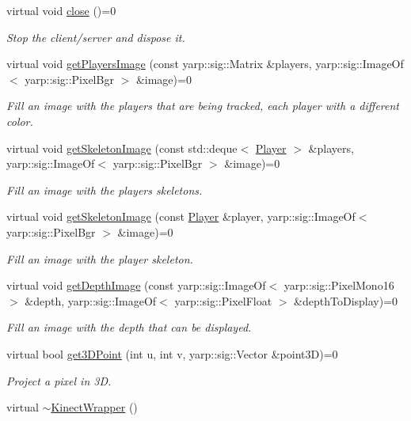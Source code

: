 \begin{DoxyCompactItemize}
virtual void \hyperlink{classkinectWrapper_1_1KinectWrapper_a9838a284ff45200ab7978bff25e3b4b3}{close} ()=0
\begin{DoxyCompactList}\small\item\em Stop the client/server and dispose it. \end{DoxyCompactList}\item 
virtual void \hyperlink{classkinectWrapper_1_1KinectWrapper_ad544a82270b338a2a07d66cf3883ca62}{get\+Players\+Image} (const yarp\+::sig\+::\+Matrix \&players, yarp\+::sig\+::\+Image\+Of$<$ yarp\+::sig\+::\+Pixel\+Bgr $>$ \&image)=0
\begin{DoxyCompactList}\small\item\em Fill an image with the players that are being tracked, each player with a different color. \end{DoxyCompactList}\item 
virtual void \hyperlink{classkinectWrapper_1_1KinectWrapper_a5ade44152da43fcae418e6baae7c713a}{get\+Skeleton\+Image} (const std\+::deque$<$ \hyperlink{structkinectWrapper_1_1Player}{Player} $>$ \&players, yarp\+::sig\+::\+Image\+Of$<$ yarp\+::sig\+::\+Pixel\+Bgr $>$ \&image)=0
\begin{DoxyCompactList}\small\item\em Fill an image with the players skeletons. \end{DoxyCompactList}\item 
virtual void \hyperlink{classkinectWrapper_1_1KinectWrapper_a97c51c1e4e1b2918e62aa7621d26b7dc}{get\+Skeleton\+Image} (const \hyperlink{structkinectWrapper_1_1Player}{Player} \&player, yarp\+::sig\+::\+Image\+Of$<$ yarp\+::sig\+::\+Pixel\+Bgr $>$ \&image)=0
\begin{DoxyCompactList}\small\item\em Fill an image with the player skeleton. \end{DoxyCompactList}\item 
virtual void \hyperlink{classkinectWrapper_1_1KinectWrapper_a51bbf5f801626d07bfe6059fd80d1a50}{get\+Depth\+Image} (const yarp\+::sig\+::\+Image\+Of$<$ yarp\+::sig\+::\+Pixel\+Mono16 $>$ \&depth, yarp\+::sig\+::\+Image\+Of$<$ yarp\+::sig\+::\+Pixel\+Float $>$ \&depth\+To\+Display)=0
\begin{DoxyCompactList}\small\item\em Fill an image with the depth that can be displayed. \end{DoxyCompactList}\item 
virtual bool \hyperlink{classkinectWrapper_1_1KinectWrapper_abc3df8e268fc0c8a799b1a1d061dde12}{get3\+D\+Point} (int u, int v, yarp\+::sig\+::\+Vector \&point3D)=0
\begin{DoxyCompactList}\small\item\em Project a pixel in 3D. \end{DoxyCompactList}\item 
virtual \hyperlink{classkinectWrapper_1_1KinectWrapper_a516e88d370169f4e3e1aa6bfed734538}{$\sim$\+Kinect\+Wrapper} ()\label{classkinectWrapper_1_1KinectWrapper_a516e88d370169f4e3e1aa6bfed734538}


\end{DoxyCompactItemize}
